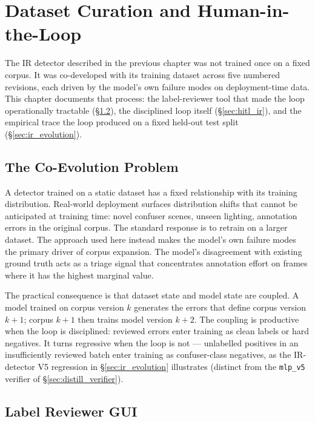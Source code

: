 \documentclass[12pt,a4paper,oneside,openright]{book}
\begin{document}
\chapter{Dataset Curation and Human-in-the-Loop}
\label{ch:hitl}

The IR detector described in the previous chapter was not trained once on a fixed corpus. It was co-developed with its training dataset across five numbered revisions, each driven by the model's own failure modes on deployment-time data. This chapter documents that process: the label-reviewer tool that made the loop operationally tractable (\S\ref{sec:label_reviewer}), the disciplined loop itself (\S\ref{sec:hitl_ir}), and the empirical trace the loop produced on a fixed held-out test split (\S\ref{sec:ir_evolution}).

\section{The Co-Evolution Problem}
\label{sec:coevolution}

A detector trained on a static dataset has a fixed relationship with its training distribution. Real-world deployment surfaces distribution shifts that cannot be anticipated at training time: novel confuser scenes, unseen lighting, annotation errors in the original corpus. The standard response is to retrain on a larger dataset. The approach used here instead makes the model's own failure modes the primary driver of corpus expansion. The model's disagreement with existing ground truth acts as a triage signal that concentrates annotation effort on frames where it has the highest marginal value.

The practical consequence is that dataset state and model state are coupled. A model trained on corpus version $k$ generates the errors that define corpus version $k+1$; corpus $k+1$ then trains model version $k+2$. The coupling is productive when the loop is disciplined: reviewed errors enter training as clean labels or hard negatives. It turns regressive when the loop is not --- unlabelled positives in an insufficiently reviewed batch enter training as confuser-class negatives, as the IR-detector V5 regression in \S\ref{sec:ir_evolution} illustrates (distinct from the \texttt{mlp\_v5} verifier of \S\ref{sec:distill_verifier}).

\section{Label Reviewer GUI}
\label{sec:label_reviewer}
\end{document}
